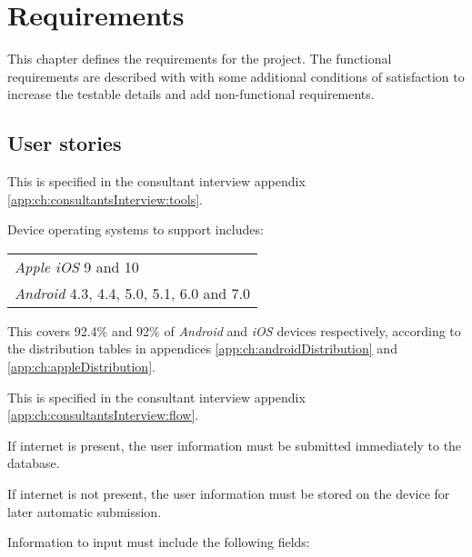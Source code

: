 \chapter{Requirements}\label{ch:Requirements}
This chapter defines the requirements for the project.
The functional requirements are described with  with some additional conditions of satisfaction to increase the testable details and add non-functional requirements.

\section*{User stories}


This  is specified in the consultant interview appendix \ref{app:ch:consultantsInterview:tools}.

Device operating systems to support includes: \newline
\begin{tabularx}{\textwidth}{X}
    \textit{Apple iOS} 9 and 10 \\
    \textit{Android} 4.3, 4.4, 5.0, 5.1, 6.0 and 7.0
\end{tabularx}

This covers 92.4\% and 92\% of \textit{Android} and \textit{iOS} devices respectively, according to the distribution tables in appendices \ref{app:ch:androidDistribution} and \ref{app:ch:appleDistribution}.


This  is specified in the consultant interview appendix \ref{app:ch:consultantsInterview:flow}.

If internet is present, the user information must be submitted immediately to the database.

If internet is not present, the user information must be stored on the device for later automatic submission.

Information to input must include the following fields:\newline
{}

